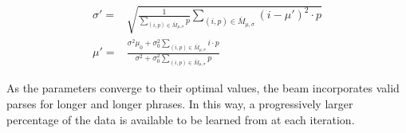 \begin{align}
	\sigma' =& \sqrt{
		\frac{ 1 } { \sum\limits_{(i,p) \in \bar M_{\mu,\sigma}}  p }
		\sum\limits_{(i,p) \in \bar M_{\mu,\sigma}} (i-\mu')^2 \cdot p
	} \\
	\mu' =&
		\frac{
			\sigma^2 \mu_0 + \sigma_0^2 \sum_{(i,p) \in \bar M_{\mu,\sigma}}  i \cdot p
		}{
			\sigma^2 + \sigma_0^2 \sum_{(i,p) \in \bar M_{\mu,\sigma}} p 
		}
\label{eqn:gaussianEM}
\end{align}

As the parameters converge to their optimal values, the beam incorporates
	valid parses for longer and longer phrases.
In this way, a progressively larger percentage of the data is available to be
	learned from at each iteration.

%
%

